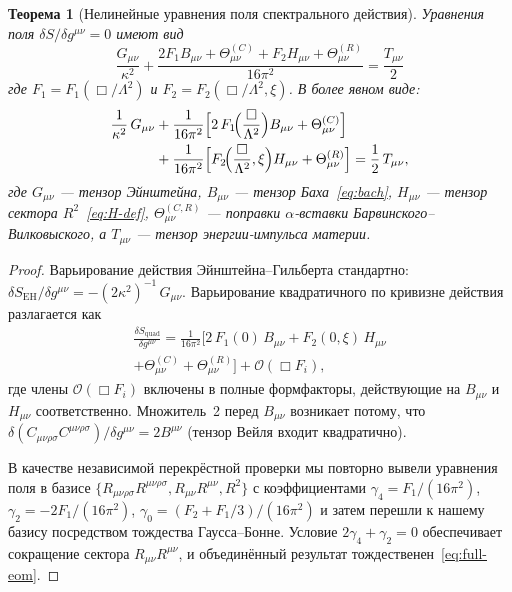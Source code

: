 \documentclass[12pt,a4paper]{article}
\newcommand{\Weylsq}{C_{\mu\nu\rho\sigma}C^{\mu\nu\rho\sigma}}
\newcommand{\Ricsq}{R_{\mu\nu}R^{\mu\nu}}
\newcommand{\Riemsq}{R_{\mu\nu\rho\sigma}R^{\mu\nu\rho\sigma}}
\newcommand{\order}{\mathcal{O}}
\newcommand{\Lam}{\Lambda}
\theoremstyle{plain}
\newtheorem{theorem}{Теорема}[section]
\theoremstyle{definition}
\begin{document}
\begin{theorem}[Нелинейные уравнения поля спектрального действия]
\label{thm:field-eqs}
Уравнения поля $\delta S/\delta g^{\mu\nu} = 0$ имеют вид
\begin{equation}\label{eq:full-eom}
  \boxed{\;
  \frac{G_{\mu\nu}}{\kappa^2}
  + \frac{2F_1 B_{\mu\nu}
    + \Theta^{(C)}_{\mu\nu}
    + F_2 H_{\mu\nu}
    + \Theta^{(R)}_{\mu\nu}}{16\pi^2}
  = \frac{T_{\mu\nu}}{2}\;
  }
\end{equation}
где $F_1 = F_1(\Box/\Lam^2)$ и $F_2 = F_2(\Box/\Lam^2,\xi)$.
В более явном виде:
\begin{align}\label{eq:full-eom-expanded}
  \frac{1}{\kappa^2}\,G_{\mu\nu}
  &+ \frac{1}{16\pi^2}\Bigl[2\,F_1\!\Bigl(\frac{\Box}{\Lam^2}\Bigr)
    B_{\mu\nu}
    + \Theta^{(C)}_{\mu\nu}\Bigr] \notag\\
  &+ \frac{1}{16\pi^2}\Bigl[F_2\!\Bigl(\frac{\Box}{\Lam^2},\xi\Bigr)
    H_{\mu\nu}
    + \Theta^{(R)}_{\mu\nu}\Bigr]
  = \frac{1}{2}\,T_{\mu\nu},
\end{align}
где $G_{\mu\nu}$ --- тензор Эйнштейна, $B_{\mu\nu}$ --- тензор
Баха~\eqref{eq:bach}, $H_{\mu\nu}$ --- тензор сектора
$R^2$~\eqref{eq:H-def}, $\Theta^{(C,R)}_{\mu\nu}$ --- поправки
$\alpha$-вставки Барвинского--Вилковыского, а $T_{\mu\nu}$ --- тензор
энергии-импульса материи.
\end{theorem}

\begin{proof}
Варьирование действия Эйнштейна--Гильберта стандартно:
$\delta S_{\mathrm{EH}}/\delta g^{\mu\nu}
= -(2\kappa^2)^{-1}\,G_{\mu\nu}$.
Варьирование квадратичного по кривизне действия разлагается как
\begin{multline}\label{eq:var-decomp}
  \frac{\delta S_{\mathrm{quad}}}{\delta g^{\mu\nu}}
  = \frac{1}{16\pi^2}\bigl[2\,F_1(0)\,B_{\mu\nu}
    + F_2(0,\xi)\,H_{\mu\nu} \\
    + \Theta^{(C)}_{\mu\nu} + \Theta^{(R)}_{\mu\nu}\bigr]
    + \order(\Box F_i),
\end{multline}
где члены $\order(\Box F_i)$ включены в полные формфакторы, действующие
на $B_{\mu\nu}$ и $H_{\mu\nu}$ соответственно.  Множитель~2 перед
$B_{\mu\nu}$ возникает потому, что $\delta(\Weylsq)/\delta g^{\mu\nu}
= 2B^{\mu\nu}$ (тензор Вейля входит квадратично).

В качестве независимой перекрёстной проверки мы повторно вывели уравнения
поля в базисе $\{\Riemsq, \Ricsq, R^2\}$ с коэффициентами
$\gamma_4 = F_1/(16\pi^2)$, $\gamma_2 = -2F_1/(16\pi^2)$,
$\gamma_0 = (F_2 + F_1/3)/(16\pi^2)$ и затем перешли к нашему базису
посредством тождества Гаусса--Бонне.  Условие $2\gamma_4 + \gamma_2 = 0$
обеспечивает сокращение сектора $\Ricsq$, и объединённый результат
тождественен~\eqref{eq:full-eom}.
\end{proof}
\end{document}
